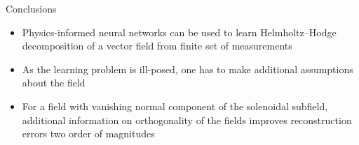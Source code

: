\documentclass[11pt,aspectratio=169,t]{beamer}
\begin{document}


\begin{frame}{Conclusions}
\begin{itemize}
    \item Physics-informed neural networks can be used to learn Helmholtz--Hodge
        decomposition of a vector field from finite set of measurements
    \item As the learning problem is ill-posed, one has to make additional
        assumptions about the field
    \item For a field with vanishing normal component of the solenoidal subfield,
        additional information on orthogonality of the fields improves
        reconstruction errors two order of magnitudes
\end{itemize}
\end{frame}
\end{document}
